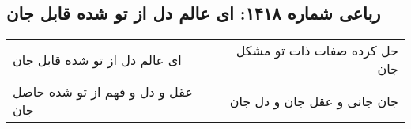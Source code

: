\begin{center}
\section*{رباعی شماره ۱۴۱۸: ای عالم دل از تو شده قابل جان}
\label{sec:1418}
\begin{longtable}{l p{0.5cm} r}
ای عالم دل از تو شده قابل جان
&&
حل کرده صفات ذات تو مشکل جان
\\
عقل و دل و فهم از تو شده حاصل جان
&&
جان جانی و عقل جان و دل جان
\\
\end{longtable}
\end{center}
